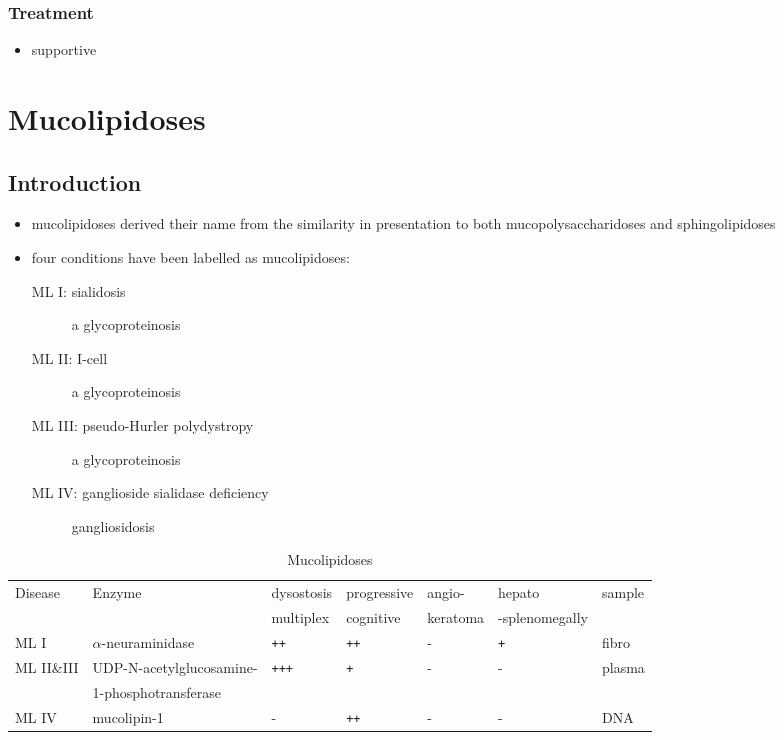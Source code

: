 \documentclass[12pt]{scrartcl}
\begin{document}
\subsubsection{Treatment}
\label{sec:org54bb54f}
\begin{itemize}
\item supportive
\end{itemize}
\section{Mucolipidoses}
\label{sec:org43ff302}
\subsection{Introduction}
\label{sec:org3c50354}
\begin{itemize}
\item mucolipidoses derived their name from the similarity in
presentation to both mucopolysaccharidoses and sphingolipidoses
\item four conditions have been labelled as mucolipidoses:
\begin{description}
\item[{ML I: sialidosis}] a glycoproteinosis
\item[{ML II: I-cell}] a glycoproteinosis
\item[{ML III: pseudo-Hurler polydystropy}] a glycoproteinosis
\item[{ML IV: ganglioside sialidase deficiency}] gangliosidosis
\end{description}
\end{itemize}


\begin{table}[htbp]
\caption{\label{tab:orgaa0a389}Mucolipidoses}
\centering
\small
\begin{tabular}{lllllll}
Disease & Enzyme & dysostosis & progressive & angio- & hepato & sample\\
 &  & multiplex & cognitive & keratoma & -splenomegally & \\
\hline
ML I & \(\alpha\)-neuraminidase & \texttt{++} & \texttt{++} & - & \texttt{+} & fibro\\
ML II\&III & UDP-N-acetylglucosamine- & \texttt{+++} & \texttt{+} & - & - & plasma\\
 & 1-phosphotransferase &  &  &  &  & \\
ML IV & mucolipin-1 & - & \texttt{++} & - & - & DNA\\
\end{tabular}
\end{table}
\end{document}
